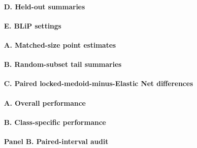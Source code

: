 

\paragraph*{D. Held-out summaries}



\paragraph*{E. BLiP settings}









\paragraph*{A. Matched-size point estimates}



\paragraph*{B. Random-subset tail summaries}



\paragraph*{C. Paired locked-medoid-minus-Elastic Net differences}



\paragraph*{A. Overall performance}



\paragraph*{B. Class-specific performance}





\paragraph*{Panel B. Paired-interval audit}

